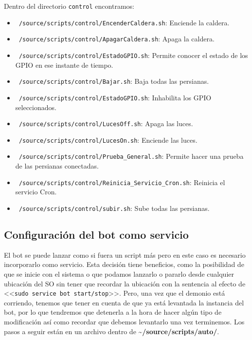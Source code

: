 Dentro del directorio \texttt{control} encontramos:
\begin{itemize}
    \item \texttt{~/source/scripts/control/EncenderCaldera.sh}: Enciende la caldera.
    \item \texttt{~/source/scripts/control/ApagarCaldera.sh}: Apaga la caldera.
    \item \texttt{~/source/scripts/control/EstadoGPIO.sh}: Permite conocer el estado de los GPIO en ese instante de tiempo.
    \item \texttt{~/source/scripts/control/Bajar.sh}: Baja todas las persianas.
    \item \texttt{~/source/scripts/control/EstadoGPIO.sh}: Inhabilita los GPIO seleccionados.
    \item \texttt{~/source/scripts/control/LucesOff.sh}: Apaga las luces.
    \item \texttt{~/source/scripts/control/LucesOn.sh}: Enciende las luces.
    \item \texttt{~/source/scripts/control/Prueba\_General.sh}: Permite hacer una prueba de las persianas conectadas.
    \item \texttt{~/source/scripts/control/Reinicia\_Servicio\_Cron.sh}: Reinicia el servicio Cron.
    \item \texttt{~/source/scripts/control/subir.sh}: Sube todas las persianas.
    
\end{itemize}


\subsection{Configuración del bot como servicio}
El bot se puede lanzar como si fuera un script más pero en este caso es necesario incorporarlo como servicio. Esta decisión tiene beneficios, como la posibilidad de que se inicie con el sistema o que podamos lanzarlo o pararlo desde cualquier ubicación del SO sin tener que recordar la ubicación con la sentencia al efecto de <<\texttt{sudo service bot start/stop}>>. Pero, una vez que el demonio está corriendo, tenemos que tener en cuenta de que ya está levantada la instancia del bot, por lo que tendremos que detenerla a la hora de hacer algún tipo de modificación así como recordar que debemos levantarlo una vez terminemos. Los pasos a seguir están en un archivo dentro de \textbf{\textasciitilde/source/scripts/auto/}.

